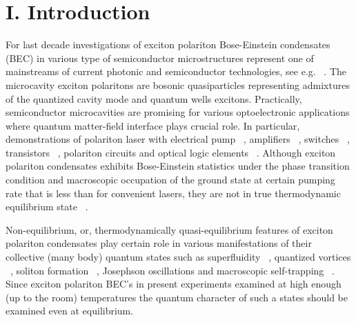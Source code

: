 \documentclass[aps,prl,preprint,groupedaddress]{revtex4-1}
\begin{document}
\section{I.	Introduction}
For last decade  investigations of  exciton polariton Bose-Einstein condensates (BEC) in various type of semiconductor microstructures represent one of mainstreams of current photonic and semiconductor technologies, see e.g. ~\cite{1,2}.  The microcavity exciton polaritons are bosonic quasiparticles representing  admixtures of the quantized cavity mode and quantum wells excitons. Practically,  semiconductor microcavities are promising for various optoelectronic applications where quantum  matter-field interface  plays crucial role. In particular,  demonstrations of polariton laser with electrical pump ~\cite{3,4}, amplifiers ~\cite{5}, switches ~\cite{6},  transistors ~\cite{7}, polariton circuits and optical logic elements ~\cite{8,9}. Although exciton polariton condensates exhibits Bose-Einstein statistics under the phase transition condition and macroscopic occupation of the ground state at certain pumping rate that is less than for convenient lasers, they are not in true  thermodynamic equilibrium state ~\cite{10,11}.
  
Non-equilibrium, or, thermodynamically quasi-equilibrium  features of exciton polariton condensates play certain role in various manifestations of their collective  (many body) quantum states such as  superfluidity ~\cite{12,13},  quantized vortices ~\cite{14,15},  soliton formation ~\cite{16},  Josephson oscillations and macroscopic self-trapping ~\cite{17,18}. Since exciton polariton BEC’s in  present experiments examined at high enough (up to the room) temperatures the quantum  character of such a states should be examined even at equilibrium.
\end{document}
